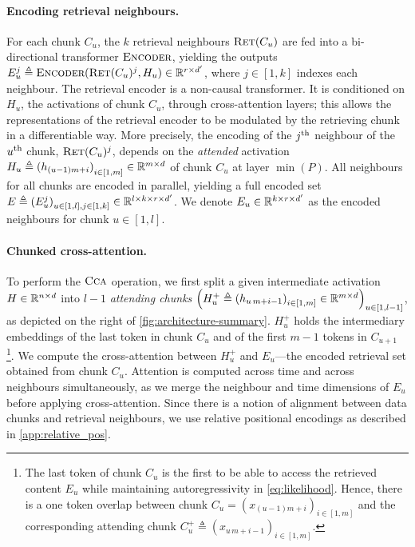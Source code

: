 \documentclass[11pt, a4paper, logo]{deepmind}
\newcommand{\encoder} {\textsc{Encoder}}
\newcommand{\ccca}{\textsc{Cca}}
\newcommand{\ret}{\textsc{Ret}}
\renewcommand{\encoder}{\textsc{Encoder}}
\begin{document}
\paragraph{Encoding retrieval neighbours.} For each chunk $C_u$, the $k$ retrieval neighbours $\ret(C_u)$ are fed into a bi-directional transformer $\encoder$, yielding the outputs $E_u^j \triangleq \encoder(\ret(C_u)^j, H_u) \in \RR^{r \times d'}$, where $j \in [1, k]$ indexes each neighbour. The retrieval encoder is a non-causal transformer.
It is conditioned on $H_u$, the activations of chunk $C_u$, through cross-attention layers; this allows the representations of the retrieval encoder to be modulated by the retrieving chunk in a differentiable way. 
More precisely, the encoding of the $j\textsuperscript{th}$ neighbour of the $u\textsuperscript{th}$ chunk, $\ret(C_u)^j$, depends on the \textit{attended} activation $H_u \triangleq {(h_{(u-1) m + i})}_{i \in [1, m]}\in \mathbb{R}^{m \times d}$ of chunk $C_u$ at layer $\min(P)$.
All neighbours for all chunks are encoded in parallel, yielding a full encoded set $E \triangleq {(E_u^j)}_{u \in [1, l], j \in [1, k]} \in \mathbb{R}^{l \times k \times r \times d'}$.
We denote $E_u \in \mathbb{R}^{k \times r \times d'}$ as the encoded neighbours for chunk $u \in [1, l]$.

\paragraph{Chunked cross-attention.}
To perform the $\ccca$ operation, we first split a given intermediate activation $H \in \mathbb{R}^{n \times d}$ into $l{-}1$ \textit{attending chunks} ${\left(H_u^+ \triangleq {(h_{u\,m +i - 1})}_{i \in [1, m]} \in \mathbb{R}^{m \times d} \right)}_{u \in [1, l-1]}$, as depicted on the right of \autoref{fig:architecture-summary}.
$H_u^+$ holds the intermediary embeddings of the last token in chunk $C_u$ and of the first $m-1$ tokens in $C_{u+1}$
\footnote{The last token of chunk $C_u$ is the first to be able to access the retrieved content $E_u$ while maintaining autoregressivity in \eqref{eq:likelihood}. Hence, there is a one token overlap between chunk $C_u =  { \left( x_{(u-1) m + i} \right) }_{i \in [1, m]}$ and the corresponding attending chunk $C_u^+ \triangleq { \left (x_{u \, m + i -1} \right )}_{i \in [1, m]}$.
}. 
We compute the cross-attention between $H_u^+$ and $E_u$---the encoded retrieval set obtained from chunk $C_u$. Attention is computed across time and across neighbours simultaneously, as we merge the neighbour and time dimensions of $E_u$ before applying cross-attention.
Since there is a notion of alignment between data chunks and retrieval neighbours, we use relative positional encodings as described in \autoref{app:relative_pos}.
\end{document}
